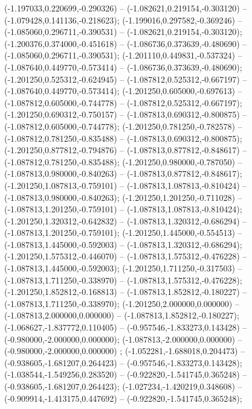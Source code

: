  (-1.197033,0.220699,-0.290326) -- (-1.082621,0.219154,-0.303120) -- (-1.079428,0.141136,-0.218623);
 (-1.199016,0.297582,-0.369246) -- (-1.085060,0.296711,-0.390531) -- (-1.082621,0.219154,-0.303120);
 (-1.200376,0.374000,-0.451618) -- (-1.086736,0.373639,-0.480690) -- (-1.085060,0.296711,-0.390531);
 (-1.201110,0.449831,-0.537324) -- (-1.087640,0.449770,-0.573414) -- (-1.086736,0.373639,-0.480690);
 (-1.201250,0.525312,-0.624945) -- (-1.087812,0.525312,-0.667197) -- (-1.087640,0.449770,-0.573414);
 (-1.201250,0.605000,-0.697613) -- (-1.087812,0.605000,-0.744778) -- (-1.087812,0.525312,-0.667197);
 (-1.201250,0.690312,-0.750157) -- (-1.087813,0.690312,-0.800875) -- (-1.087812,0.605000,-0.744778);
 (-1.201250,0.781250,-0.782578) -- (-1.087812,0.781250,-0.835488) -- (-1.087813,0.690312,-0.800875);
 (-1.201250,0.877812,-0.794876) -- (-1.087813,0.877812,-0.848617) -- (-1.087812,0.781250,-0.835488);
 (-1.201250,0.980000,-0.787050) -- (-1.087813,0.980000,-0.840263) -- (-1.087813,0.877812,-0.848617);
 (-1.201250,1.087813,-0.759101) -- (-1.087813,1.087813,-0.810424) -- (-1.087813,0.980000,-0.840263);
 (-1.201250,1.201250,-0.711028) -- (-1.087813,1.201250,-0.759101) -- (-1.087813,1.087813,-0.810424);
 (-1.201250,1.320312,-0.642832) -- (-1.087813,1.320312,-0.686294) -- (-1.087813,1.201250,-0.759101);
 (-1.201250,1.445000,-0.554513) -- (-1.087813,1.445000,-0.592003) -- (-1.087813,1.320312,-0.686294);
 (-1.201250,1.575312,-0.446070) -- (-1.087813,1.575312,-0.476228) -- (-1.087813,1.445000,-0.592003);
 (-1.201250,1.711250,-0.317503) -- (-1.087813,1.711250,-0.338970) -- (-1.087813,1.575312,-0.476228);
 (-1.201250,1.852812,-0.168813) -- (-1.087813,1.852812,-0.180227) -- (-1.087813,1.711250,-0.338970);
 (-1.201250,2.000000,0.000000) -- (-1.087813,2.000000,0.000000) -- (-1.087813,1.852812,-0.180227);
 (-1.068627,-1.837772,0.110405) -- (-0.957546,-1.833273,0.143428) -- (-0.980000,-2.000000,0.000000);
 (-1.087813,-2.000000,0.000000) -- (-0.980000,-2.000000,0.000000) ;
 (-1.052281,-1.688018,0.204473) -- (-0.938605,-1.681207,0.264423) -- (-0.957546,-1.833273,0.143428);
 (-1.038544,-1.549256,0.283520) -- (-0.922820,-1.541745,0.365248) -- (-0.938605,-1.681207,0.264423);
 (-1.027234,-1.420219,0.348608) -- (-0.909914,-1.413175,0.447692) -- (-0.922820,-1.541745,0.365248);
